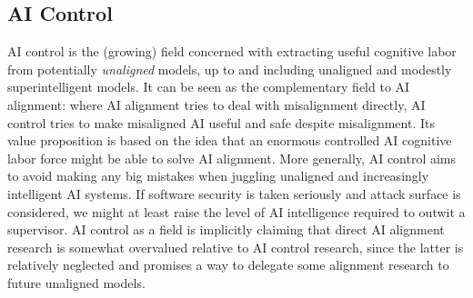 \subsection{AI Control}



AI control \cite{greenblatt2024aicontrol} is the (growing) field concerned with
extracting useful cognitive labor from potentially \emph{unaligned} models, up
to and including unaligned and modestly superintelligent models. It can be seen
as the complementary field to AI alignment: where AI alignment tries to deal
with misalignment directly, AI control tries to make misaligned AI useful and
safe despite misalignment. Its value proposition is based on the idea that an
enormous controlled AI cognitive labor force might be able to solve AI
alignment. More generally, AI control aims to avoid making any big mistakes
when juggling unaligned and increasingly intelligent AI systems. If software
security is taken seriously and attack surface is considered, we might at least
raise the level of AI intelligence required to outwit a supervisor. AI control
as a field is implicitly claiming that direct AI alignment research is somewhat
overvalued relative to AI control research, since the latter is relatively
neglected and promises a way to delegate some alignment research to future
unaligned models.


